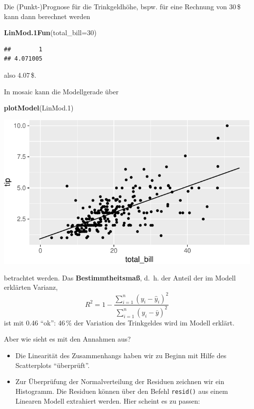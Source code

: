 \documentclass[12pt,ngerman,paper=a4,pagesize,DIV=13]{scrreprt}
\newenvironment{Shaded}{\begin{snugshade}}{\end{snugshade}}
\newcommand{\DataTypeTok}[1]{\textcolor[rgb]{0.13,0.29,0.53}{#1}}
\newcommand{\DecValTok}[1]{\textcolor[rgb]{0.00,0.00,0.81}{#1}}
\newcommand{\FloatTok}[1]{\textcolor[rgb]{0.00,0.00,0.81}{#1}}
\newcommand{\KeywordTok}[1]{\textcolor[rgb]{0.13,0.29,0.53}{\textbf{#1}}}
\newcommand{\NormalTok}[1]{#1}
\providecommand{\tightlist}{%
  \setlength{\itemsep}{0pt}\setlength{\parskip}{0pt}}
\begin{document}
Die (Punkt-)Prognose für die Trinkgeldhöhe, bspw. für eine Rechnung von
30\(\,\)\$ kann dann berechnet werden

\begin{Shaded}
\begin{Highlighting}[]
\KeywordTok{LinMod.1Fun}\NormalTok{(}\DataTypeTok{total_bill=}\DecValTok{30}\NormalTok{)}
\end{Highlighting}
\end{Shaded}

\begin{verbatim}
##        1 
## 4.071005
\end{verbatim}

also 4.07\(\,\)\$.

In mosaic kann die Modellgerade über

\begin{Shaded}
\begin{Highlighting}[]
\KeywordTok{plotModel}\NormalTok{(LinMod}\FloatTok{.1}\NormalTok{)}
\end{Highlighting}
\end{Shaded}

\includegraphics{DatenerhebungStatistik-Uebung_files/figure-latex/unnamed-chunk-164-1.pdf}

betrachtet werden. Das \textbf{Bestimmtheitsmaß}, d.~h. der Anteil der
im Modell erklärten Varianz,
\[R^2=1-\frac{\sum_{i=1}^n (y_i-\hat{y}_i)^2}{\sum_{i=1}^n (y_i-\bar{y})^2}\]
ist mit 0.46 \enquote{ok}: 46\(\,\)\% der Variation des Trinkgeldes wird
im Modell erklärt.

Aber wie sieht es mit den Annahmen aus?

\begin{itemize}
\tightlist
\item
  Die Linearität des Zusammenhangs haben wir zu Beginn mit Hilfe des
  Scatterplots \enquote{überprüft}.
\item
  Zur Überprüfung der Normalverteilung der Residuen zeichnen wir ein
  Histogramm. Die Residuen können über den Befehl \texttt{resid()} aus
  einem Linearen Modell extrahiert werden. Hier scheint es zu passen:
\end{itemize}
\end{document}

